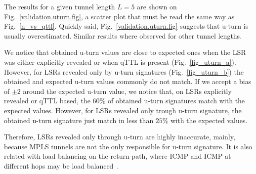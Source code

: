 The results for a given tunnel length $L=5$ are shown on
Fig.~\ref{validation.uturn.fig}, a scatter plot that must be read the same way
as Fig.~\ref{n_vs_qttl}.  Quickly said, Fig.~\ref{validation.uturn.fig} suggests
that u-turn is usually overestimated. Similar results where observed for other
tunnel lengths. 

We notice that obtained u-turn values are close to expected ones when the LSR
was either explicitly revealed or when qTTL is present (Fig.~\ref{fig_uturn_a}).
However, for LSRs revealed only by u-turn signatures (Fig.~\ref{fig_uturn_b})
the obtained and expected u-turn values commonly do not match. If we accept a
bias of $ \pm 2$ around the expected u-turn value, we notice that, on LSRs
explicitly revealed or qTTL based, the $60\%$ of obtained u-turn signatures
match with the expected values. However, for LSRs revealed only trough u-turn
signature, the obtained u-turn signature just match in less than $25\%$  with
the expected values.

Therefore, LSRs revealed only through u-turn are highly inaccurate, mainly,
because MPLS tunnels are not the only responsible for u-turn signature.  It is
also related with load balancing on the return path, where ICMP \echoreply and
ICMP \ttlexceeded at different hops may be load balanced~\cite{BRICE06}. 


